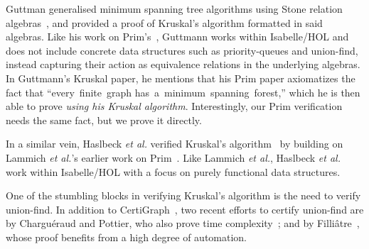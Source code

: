 Guttman generalised minimum spanning tree algorithms using Stone relation algebras~\cite{DBLP:journals/jlp/Guttmann18}, and provided a proof of Kruskal's algorithm formatted in said algebras.  Like his work on Prim's~\cite{DBLP:conf/ictac/Guttmann16}, Guttmann works within Isabelle/HOL and does not include concrete data structures such as priority-queues and union-find, instead capturing their action as equivalence relations in the underlying algebras. In Guttmann's Kruskal paper, he mentions that his Prim paper axiomatizes the fact that ``every~finite~graph has~a~minimum~spanning~forest,'' which he is then able to prove \emph{using his Kruskal algorithm}.  Interestingly, our Prim verification needs the same fact, but we prove it directly. %

In a similar vein, Haslbeck \emph{et al.} verified Kruskal's algorithm~\cite{DBLP:journals/afp/HaslbeckLB19} by building on Lammich \emph{et al.}'s earlier work on Prim~\cite{DBLP:journals/afp/LammichN19}.  Like Lammich \emph{et al.}, Haslbeck \emph{et al.} work within Isabelle/HOL with a focus on purely functional data structures.

One of the stumbling blocks in verifying Kruskal's algorithm is the need to verify union-find.  In addition to CertiGraph~\cite{DBLP:journals/pacmpl/WangCMH19}, two recent efforts to certify union-find are by Chargu{\'{e}}raud and Pottier, who also prove time complexity~\cite{charpott19}; and by Filli\^atre~\cite{FILLIATRE2021100645}, whose proof benefits from a high degree of automation.





